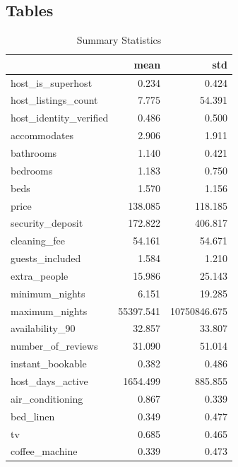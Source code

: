 \renewcommand{\thesubsection}{\Alph{subsection}}
\subsection{Tables}
\begin{table}[H]
    \centering
    \caption{Summary Statistics}
    \label{tab:descriptive-statistic}
{\small

\begin{tabular}{lrr}
\toprule
{} &      mean &          std \\
\midrule
host\_is\_superhost      &     0.234 &        0.424 \\
host\_listings\_count    &     7.775 &       54.391 \\
host\_identity\_verified &     0.486 &        0.500 \\
accommodates           &     2.906 &        1.911 \\
bathrooms              &     1.140 &        0.421 \\
bedrooms               &     1.183 &        0.750 \\
beds                   &     1.570 &        1.156 \\
price                  &   138.085 &      118.185 \\
security\_deposit       &   172.822 &      406.817 \\
cleaning\_fee           &    54.161 &       54.671 \\
guests\_included        &     1.584 &        1.210 \\
extra\_people           &    15.986 &       25.143 \\
minimum\_nights         &     6.151 &       19.285 \\
maximum\_nights         & 55397.541 & 10750846.675 \\
availability\_90        &    32.857 &       33.807 \\
number\_of\_reviews      &    31.090 &       51.014 \\
instant\_bookable       &     0.382 &        0.486 \\
host\_days\_active       &  1654.499 &      885.855 \\
air\_conditioning       &     0.867 &        0.339 \\
bed\_linen              &     0.349 &        0.477 \\
tv                     &     0.685 &        0.465 \\
coffee\_machine         &     0.339 &        0.473 \\

\end{tabular}}
\end{table}

